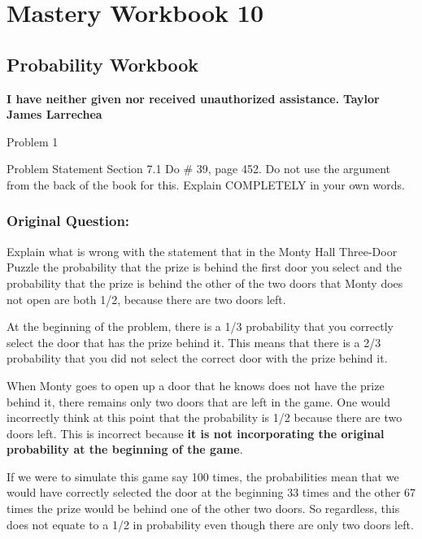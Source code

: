\clearpage
\chapter{Mastery Workbook 10}

\section{Probability Workbook}


\begin{center}
    \Large{\textbf{I have neither given nor received unauthorized assistance.}}
    \large{\textbf{Taylor James Larrechea}}
\end{center}

\begin{problem}{Problem 1}
    \begin{statement}{Problem Statement}
        Section 7.1 Do \# 39, page 452. Do not use the argument from the back of the book for this. Explain COMPLETELY in your own words.

        \subsection*{Original Question:}

        Explain what is wrong with the statement that in the Monty Hall Three-Door Puzzle the probability that the prize is behind the first door you select and the probability that the prize is behind 
        the other of the two doors that Monty does not open are both 1/2, because there are two doors left.
    \end{statement}

    \begin{highlight}[Solution]
        At the beginning of the problem, there is a 1/3 probability that you correctly select the door that has the prize behind it. This means that there is a 2/3 probability that you did not select the
        correct door with the prize behind it.

        When Monty goes to open up a door that he knows does not have the prize behind it, there remains only two doors that are left in the game. One would incorrectly think at this point that the probability
        is 1/2 because there are two doors left. This is incorrect because \textbf{it is not incorporating the original probability at the beginning of the game}.

        If we were to simulate this game say 100 times, the probabilities mean that we would have correctly selected the door at the beginning 33 times and the other 67 times the prize would be behind 
        one of the other two doors. So regardless, this does not equate to a 1/2 in probability even though there are only two doors left.
    \end{highlight}
\end{problem}

